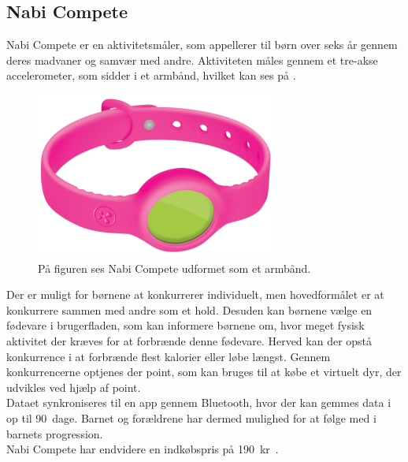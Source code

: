 \subsection{Nabi Compete}
Nabi Compete er en aktivitetsmåler, som appellerer til børn over seks år gennem deres madvaner og samvær med andre. Aktiviteten måles gennem et tre-akse accelerometer, som sidder i et armbånd, hvilket kan ses på .
\begin{figure}[H]
	\centering
	\includegraphics[scale=0.55]{figures/aProblemanalyse/nabi.png}
	\caption{På figuren ses Nabi Compete udformet som et armbånd.~\citep{Perez2015}}
	\label{fig:nabi}
\end{figure}\vspace{-.25cm}
Der er muligt for børnene at konkurrerer individuelt, men hovedformålet er at konkurrere sammen med andre som et hold. Desuden kan børnene vælge en fødevare i brugerfladen, som kan informere børnene om, hvor meget fysisk aktivitet der kræves for at forbrænde denne fødevare. Herved kan der opstå konkurrence i at forbrænde flest kalorier eller løbe længst. Gennem konkurrencerne optjenes der point, som kan bruges til at købe et virtuelt dyr, der udvikles ved hjælp af point. \\
Dataet synkroniseres til en app gennem Bluetooth, hvor der kan gemmes data i op til 90~dage. Barnet og forældrene har dermed mulighed for at følge med i barnets progression.~\citep{Fuhu2015,Fuhu_tech2015} \\
Nabi Compete har endvidere en indkøbspris på 190~kr~\citep{Fuhu2015}.


